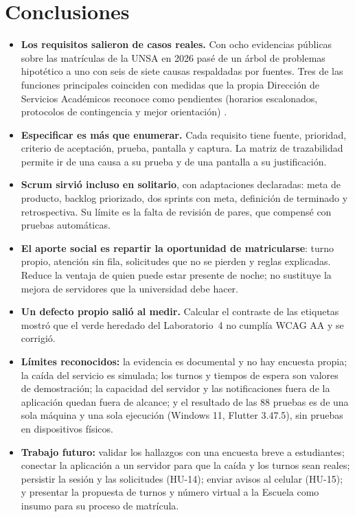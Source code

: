 \section{Conclusiones}
\label{sec:conclusiones}
\begin{itemize}
	\item \textbf{Los requisitos salieron de casos reales.} Con ocho evidencias públicas sobre las matrículas de la UNSA en 2026 pasé de un árbol de problemas hipotético a uno con seis de siete causas respaldadas por fuentes. Tres de las funciones principales coinciden con medidas que la propia Dirección de Servicios Académicos reconoce como pendientes (horarios escalonados, protocolos de contingencia y mejor orientación) \cite{elpueblo25}.
	\item \textbf{Especificar es más que enumerar.} Cada requisito tiene fuente, prioridad, criterio de aceptación, prueba, pantalla y captura. La matriz de trazabilidad permite ir de una causa a su prueba y de una pantalla a su justificación.
	\item \textbf{Scrum sirvió incluso en solitario}, con adaptaciones declaradas: meta de producto, backlog priorizado, dos sprints con meta, definición de terminado y retrospectiva. Su límite es la falta de revisión de pares, que compensé con pruebas automáticas.
	\item \textbf{El aporte social es repartir la oportunidad de matricularse}: turno propio, atención sin fila, solicitudes que no se pierden y reglas explicadas. Reduce la ventaja de quien puede estar presente de noche; no sustituye la mejora de servidores que la universidad debe hacer.
	\item \textbf{Un defecto propio salió al medir.} Calcular el contraste de las etiquetas mostró que el verde heredado del Laboratorio~4 no cumplía WCAG AA y se corrigió.
	\item \textbf{Límites reconocidos:} la evidencia es documental y no hay encuesta propia; la caída del servicio es simulada; los turnos y tiempos de espera son valores de demostración; la capacidad del servidor y las notificaciones fuera de la aplicación quedan fuera de alcance; y el resultado de las 88 pruebas es de una sola máquina y una sola ejecución (Windows 11, Flutter 3.47.5), sin pruebas en dispositivos físicos.
	\item \textbf{Trabajo futuro:} validar los hallazgos con una encuesta breve a estudiantes; conectar la aplicación a un servidor para que la caída y los turnos sean reales; persistir la sesión y las solicitudes (HU-14); enviar avisos al celular (HU-15); y presentar la propuesta de turnos y número virtual a la Escuela como insumo para su proceso de matrícula.
\end{itemize}
